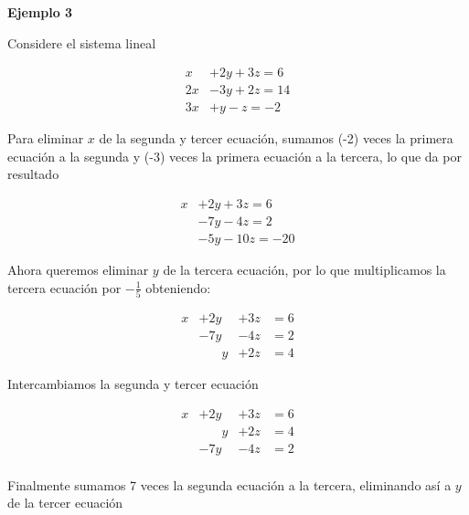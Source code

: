 \documentclass{article}
\begin{document}
\pagebreak

\begin{large}
    \textbf{Ejemplo 3}
\end{large}
Considere el sistema lineal

\begin{equation*}
    \begin{aligned}
            x & +2y + 3z = 6\\
            2x & -3y + 2z = 14\\
            3x & +y - z = -2
    \end{aligned}
\end{equation*}

Para eliminar $x$ de la segunda y tercer ecuación, sumamos (-2) veces la primera ecuación a la segunda y (-3) veces la primera ecuación a la tercera, lo que da por resultado

\begin{equation*}
    \begin{aligned}
            x & +2y + 3z = 6\\
            & -7y - 4z = 2\\
            & -5y -10z = -20
    \end{aligned}
\end{equation*}

Ahora queremos eliminar $y$ de la tercera ecuación, por lo que multiplicamos la tercera ecuación por $-\frac{1}{5}$ obteniendo:

\begin{equation*}
    \begin{aligned}
            x & +2y & + 3z &= 6\\
            & -7y & - 4z &= 2\\
            &\phantom{-98} y & + 2z &= 4
    \end{aligned}
\end{equation*}

Intercambiamos la segunda y tercer ecuación

\begin{equation*}
    \begin{aligned}
            x & +2y & + 3z &= 6\\
            &\phantom{-98} y & + 2z &= 4\\
            & -7y & - 4z &= 2\\
    \end{aligned}
\end{equation*}

Finalmente sumamos 7 veces la segunda ecuación a la tercera, eliminando así a $y$ de la tercer ecuación
\end{document}
